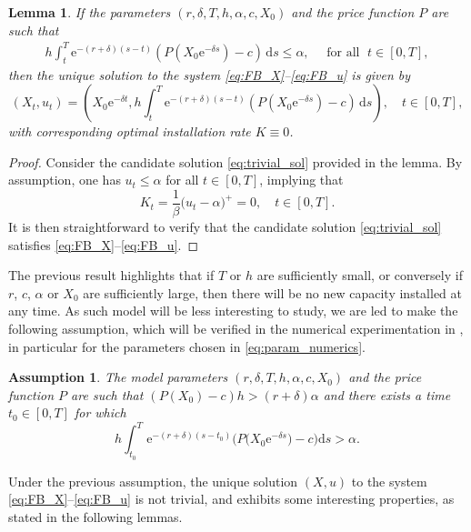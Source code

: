 \documentclass[12pt]{article}
\newtheorem{lemma}{Lemma}[section]
\newtheorem{assumption}{Assumption}[section]
\def\erm{\mathrm{e}}
\def\drm{\mathrm{d}}
\def\Nu{K}
\begin{document}
\begin{lemma}\label{lemma_trivial}
If the parameters $(r,\delta,T,h,\alpha,c,X_0)$ and the price function $P$ are such that
\begin{align*}
    h\int_{t}^{T} \erm^{-(r+\delta)(s-t)}(P(X_0 \erm^{-\delta s})-c)\, \drm s\leq\alpha, \quad \text{ for all } \; t \in [0,T],
\end{align*}
then the unique solution to the system \eqref{eq:FB_X}--\eqref{eq:FB_u} is given by
\begin{equation}\label{eq:trivial_sol}
(X_t,u_t)=\left(X_0 \erm^{-\delta t},h\int_{t}^{T} \erm^{-(r+\delta)(s-t)}(P(X_0 \erm^{-\delta s})-c)\, \drm s\right), \quad t \in [0,T],
\end{equation}
with corresponding optimal installation rate $\Nu \equiv 0$. 
\end{lemma}
\begin{proof}
Consider the candidate solution \eqref{eq:trivial_sol} provided in the lemma. By assumption, one has $u_t \leq \alpha$ for all $t \in [0,T]$, implying that 
\begin{equation*}
\Nu_t = \frac{1}{\beta} \big( u_t-\alpha\big)^+=0, \quad t \in [0,T].
\end{equation*}
It is then straightforward to verify that the candidate solution \eqref{eq:trivial_sol} satisfies \eqref{eq:FB_X}--\eqref{eq:FB_u}.
\end{proof}
The previous result highlights that if $T$ or $h$ are sufficiently small, or conversely if $r$, $c$, $\alpha$ or $X_0$ are sufficiently large, then there will be no new capacity installed at any time. As such model will be less interesting to study, we are led to make the following assumption, which will be verified in the numerical experimentation in , in particular for the parameters chosen in \eqref{eq:param_numerics}.

\begin{assumption}\label{model_assump}
The model parameters $(r,\delta,T,h,\alpha,c,X_0)$ and the price function $P$ are such that $(P(X_0)-c)h>(r+\delta)\alpha$ and there exists a time $t_0\in[0,T]$ for which 
\begin{equation*}
h\int_{t_0}^{T} \erm^{-(r+\delta)(s-t_0)}\big( P\big(X_0 \erm^{-\delta s}\big)-c\big) \drm s>\alpha.
\end{equation*}
\end{assumption}

Under the previous assumption, the unique solution $(X,u)$ to the system \eqref{eq:FB_X}–\eqref{eq:FB_u} is not trivial, and exhibits some interesting properties, as stated in the following lemmas. 
\end{document}
